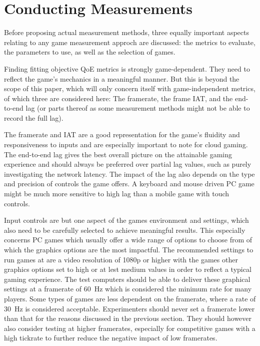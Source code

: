 \section{Conducting Measurements}
\label{sec:measurementgoals}

Before proposing actual measurement methods, three equally important 
aspects relating to any game measurement approch are discussed: the 
metrics to evaluate, the parameters to use, as well as the selection of 
games. 

Finding fitting objective \gls{QoE} metrics is strongly game-dependent. 
They need to reflect the game's mechanics in a meaningful manner. But 
this is beyond the scope of this paper, which will only concern itself 
with game-independent metrics, of which three are considered here: The 
framerate, the frame \gls{IAT}, and the end-to-end lag (or parts 
thereof as some measurement methods might not be able to record the 
full lag).

The framerate and \gls{IAT} are a good representation for the game's 
fluidity and responsiveness to inputs and are especially important to 
note for cloud gaming. The end-to-end lag gives the best overall 
picture on the attainable gaming experience and should always be 
preferred over partial lag values, such as purely investigating the 
network latency. The impact of the lag also depends on the type and 
precision of controls the game offers. A keyboard and mouse driven PC 
game might be much more sensitive to high lag than a mobile game with 
touch controls.

Input controls are but one aspect of the games environment and 
settings, which also need to be carefully selected to achieve 
meaningful results. This especially concerns PC games which usually 
offer a wide range of options to choose from of which the graphics 
options are the most impactful. The recommended settings to run games 
at are a video resolution of 1080p or higher with the games other 
graphics options set to high or at lest medium values in order to 
reflect a typical gaming experience. The test computers should be able 
to deliver these graphical settings at a framerate of \SI{60}{\hertz} 
which is considered the minimum rate for many players. Some types of 
games are less dependent on the framerate, where a rate of 
\SI{30}{\hertz} is considered acceptable. Experimenters should never 
set a framerate lower than that for the reasons discussed in the 
previous section. They should however also consider testing at higher 
framerates, especially for competitive games with a high tickrate to 
further reduce the negative impact of low framerates.


